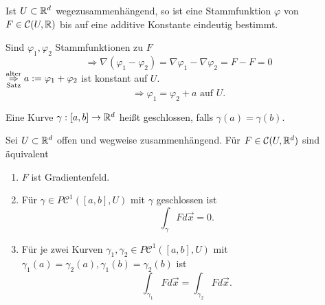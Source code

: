 \documentclass[../ana2.tex]{subfiles}
\begin{document}
\begin{lem}
    Ist \( U \subset \mathbb{R}^d \) wegezusammenhängend, so 
    ist eine Stammfunktion \( \varphi \) von \( F \in \mathcal{C}(U, \mathbb{R}) \) 
    bis auf eine additive Konstante eindeutig bestimmt.
\end{lem}
\begin{bew}
    Sind \(\varphi_1, \varphi_2 \) Stammfunktionen zu \(F\)
    \[ \Rightarrow \nabla(\varphi_1-\varphi_2) = \nabla \varphi_1 - \nabla \varphi_2 
    = F-F = 0 \]
    \( \overset{\text{alter}}{\underset{\text{Satz}}{\Rightarrow}} a := \varphi_1 + \varphi_2 \) ist 
    konstant auf \( U \). 
    \[ \Rightarrow \varphi_1 = \varphi_2 + a \text{ auf } U. \]
\end{bew}
\begin{defi}
    Eine Kurve \(\gamma:[a,b]\rightarrow \mathbb{R}^d\)
    heißt geschlossen, falls \(\gamma(a) = \gamma(b)\).
\end{defi}
\begin{satz}
    Sei \( U \subset \mathbb{R}^d\) offen und wegweise zusammenhängend.
    Für \( F \in \mathcal{C}(U, \mathbb{R}^d) \) sind äquivalent
    \begin{enumerate}
        \item \( F \) ist Gradientenfeld.
        \item Für \(\gamma \in P\mathcal{C}^1([a,b], U)\) 
        mit \(\gamma\) geschlossen ist 
        \[ \int_\gamma F d\vec{x} = 0. \]
        \item  Für je zwei Kurven \(\gamma_1, \gamma_2 \in P\mathcal{C}^1([a,b],U)\)
        mit \(\gamma_1(a) = \gamma_2(a), \gamma_1(b) = \gamma_2(b)\) ist    
        \[ \int_{\gamma_1} F d\vec{x} = \int_{\gamma_2} F d\vec{x}. \]
    \end{enumerate}
\end{satz}
\end{document}
